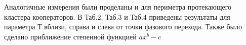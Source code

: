 \documentclass[14pt]{article}
\begin{document}
\par Аналогичные измерения были проделаны и для периметра протекающего кластера кооператоров. В Таб.2, Таб.3 и Таб.4 приведены результаты для параметра Т вблизи, справа и слева от точки фазового перехода. Также было сделано приближение степенной функцией $ax^{b} - c$
\begin{figure}[H]
	\begin{floatrow}
		\label{tab:1.799999}
	\end{floatrow}
\end{figure}
\end{document}
